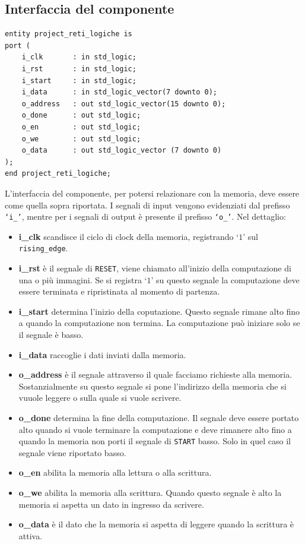 \documentclass[11pt, a4paper]{article}
\begin{document}
\subsection{Interfaccia del componente}
\begin{lstlisting}
entity project_reti_logiche is
port (
    i_clk       : in std_logic;
    i_rst       : in std_logic;
    i_start     : in std_logic;
    i_data      : in std_logic_vector(7 downto 0);
    o_address   : out std_logic_vector(15 downto 0);
    o_done      : out std_logic;
    o_en        : out std_logic;
    o_we        : out std_logic;
    o_data      : out std_logic_vector (7 downto 0)
);
end project_reti_logiche;
\end{lstlisting}
L'interfaccia del componente, per potersi relazionare con la memoria, deve essere come quella sopra riportata. I segnali di input vengono evidenziati dal prefisso \texttt{\lq i\_'}, mentre per i segnali di output è presente il prefisso \texttt{\lq o\_'}. Nel dettaglio:
\begin{itemize}
  \item \textbf{i\_clk} scandisce il ciclo di clock della memoria, registrando \lq$1$' sul \texttt{rising\_edge}.
  \item \textbf{i\_rst} è il segnale di \texttt{RESET}, viene chiamato all'inizio della computazione di una o più immagini. Se si registra \lq$1$' su questo segnale la computazione deve essere terminata e ripristinata al momento di partenza.
  \item \textbf{i\_start} determina l'inizio della coputazione. Questo segnale rimane alto fino a quando la computazione non termina. La computazione può iniziare solo se il segnale è basso.
  \item \textbf{i\_data} raccoglie i dati inviati dalla memoria.
  \item \textbf{o\_address} è il segnale attraverso il quale facciamo richieste alla memoria. Sostanzialmente su questo segnale si pone l'indirizzo della memoria che si vuuole leggere o sulla quale si vuole scrivere.
  \item \textbf{o\_done} determina la fine della computazione. Il segnale deve essere portato alto quando si vuole terminare la computazione e deve rimanere alto fino a quando la memoria non porti il segnale di \texttt{START} basso. Solo in quel caso il segnale viene riportato basso.
  \item \textbf{o\_en} abilita la memoria alla lettura o alla scrittura.
  \item \textbf{o\_we}  abilita la memoria alla scrittura. Quando questo segnale è alto la memoria si aspetta un dato in ingresso da scrivere.
  \item \textbf{o\_data} è il dato che la memoria si aspetta di leggere quando la scrittura è attiva.
\end{itemize}
\pagebreak
\end{document}
